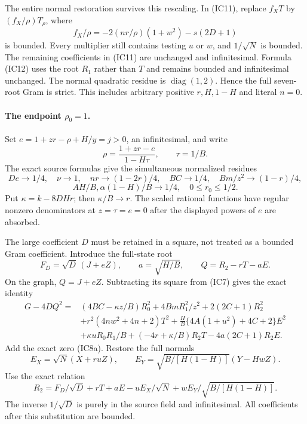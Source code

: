The entire normal restoration survives this rescaling. In (IC11),
replace $f_XT$ by $(f_X/\rho)T_\rho$, where
\[
 f_X/\rho=-2(nr/\rho)(1+w^2)-s(2D+1)
\]
is bounded. Every multiplier still contains testing $u$ or $w$, and
$1/\sqrt N$ is bounded. The remaining coefficients in (IC11) are
unchanged and infinitesimal. Formula (IC12) uses the root $R_1$ rather
than $T$ and remains bounded and infinitesimal unchanged. The normal
quadratic residue is $\operatorname{diag}(1,2)$. Hence the full
seven-root Gram is strict. This includes arbitrary positive $r,H,1-H$
and literal $n=0$.

\paragraph{The endpoint $\rho_0=1$.}
Set $e=1+zr-\rho+H/y=j>0$, an infinitesimal, and write
\[
 \rho=\frac{1+zr-e}{1-H\tau},\qquad \tau=1/B.
\]
The exact source formulas give the simultaneous normalized residues
\[
 De\to1/4,\quad\nu\to1,\quad nr\to(1-2r)/4,\quad
 BC\to1/4,\quad Bm/z^2\to(1-r)/4,
\]
\[
 AH/B,\alpha(1-H)/B\to1/4,\quad
 0\le r_0\le1/2.
\tag{WIE3}
\]
Put $\kappa=k-8DHr$; then $\kappa/B\to r$.
The scaled rational functions have regular nonzero denominators at
$z=\tau=e=0$ after the displayed powers of $e$ are absorbed.

The large coefficient $D$ must be retained in a square, not treated
as a bounded Gram coefficient. Introduce the full-state root
\[
 F_D=\sqrt D\,(J+eZ),\qquad a=\sqrt{H/B},\qquad
 Q=R_2-rT-aE.
\]
On the graph, $Q=J+eZ$. Subtracting its square from (IC7) gives the
exact identity
\begin{align*}
 G-4DQ^2={}&(4BC-\kappa z/B)R_0^2+4BmR_1^2/z^2
       +2(2C+1)R_2^2\\
 &+r^2(4nw^2+4n+2)T^2
 +\frac HB\{4A(1+u^2)+4C+2\}E^2\\
 &+\kappa uR_0R_1/B+(-4r+\kappa/B)R_2T
       -4a(2C+1)R_2E.
\tag{WIE4}
\end{align*}
Add the exact zero (IC8a). Restore the full normals
\[
 E_X=\sqrt N(X+ruZ),\qquad
 E_Y=\sqrt{B/[H(1-H)]}(Y-HwZ).
\]
Use the exact relation
\[
 R_2=F_D/\sqrt D+rT+aE-uE_X/\sqrt N
                         +wE_Y/\sqrt{B/[H(1-H)]}.
\tag{WIE5}
\]
The inverse $1/\sqrt D$ is purely in the source field and infinitesimal.
All coefficients after this substitution are bounded.

